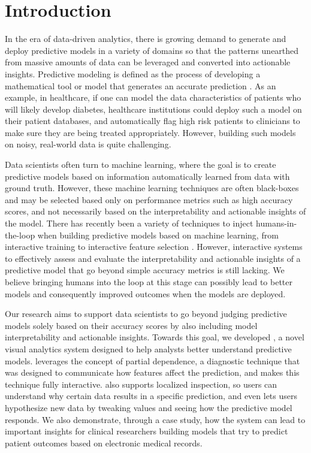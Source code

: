
\section{Introduction}

In the era of data-driven analytics, there is growing demand to generate and deploy predictive models in a variety of domains so that the patterns unearthed from massive amounts of data can be leveraged
and converted into actionable insights.
Predictive modeling is defined as the process of developing a mathematical tool or model that generates an accurate prediction \cite{kuhn2013applied}.  As an example, in healthcare, if one can model the data characteristics of patients who will likely develop diabetes, healthcare institutions could deploy such a model on their patient databases, and automatically flag high risk patients to clinicians to make sure they are being treated appropriately.  However, building such models on noisy, real-world data is quite challenging.  

Data scientists often turn to machine learning, where the goal is to create predictive models based on information automatically learned from data with ground truth.  However, these machine learning techniques are often black-boxes and may be selected based only on performance metrics such as high accuracy scores, and not necessarily based on the interpretability and actionable insights of the model.  There has recently been a variety of techniques to inject humans-in-the-loop when building predictive models based on machine learning, from interactive training \cite{export:241307} to interactive feature selection \cite{infuse}.  However, interactive systems to effectively assess and evaluate the interpretability and actionable insights of a predictive model that go beyond simple accuracy metrics is still lacking.  We believe bringing humans into the loop at this stage can possibly lead to better models and consequently improved outcomes when the models are deployed.

Our research aims to support data scientists to go beyond judging predictive models solely based on their accuracy scores by also including model interpretability and actionable insights.  Towards this goal, we developed \prospector, a novel visual analytics system designed to help analysts better understand  predictive models.  \prospector leverages the concept of partial dependence, a diagnostic technique that was designed to communicate how features affect the prediction, and makes this technique fully interactive.  \prospector also supports localized inspection, so users can understand why certain data results in a specific prediction, and even lets users hypothesize new data by tweaking values and seeing how the predictive model responds.  We also demonstrate, through a case study, how the system can lead to important insights for clinical researchers building models that try to predict patient outcomes based on electronic medical records.

